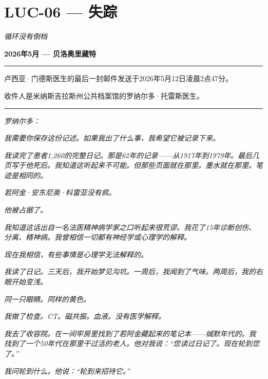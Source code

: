 \section*{\textbf{LUC-06} --- 失踪}

\noindent \textit{循环没有倒档}

\noindent \textbf{2026年5月 --- 贝洛奥里藏特}

\vspace{0.5em}\noindent\rule{\textwidth}{0.5pt}\vspace{0.5em}

\noindent 卢西亚·门德斯医生的最后一封邮件发送于2026年5月12日凌晨2点47分。

\noindent 收件人是米纳斯吉拉斯州公共档案馆的罗纳尔多·托雷斯医生。

\vspace{0.5em}\noindent\rule{\textwidth}{0.5pt}\vspace{0.5em}

\noindent \textit{罗纳尔多：}

\noindent \textit{我需要你保存这份记述。如果我出了什么事，我希望它被记录下来。}

\noindent \textit{我读完了患者1,260的完整日记。那是62年的记录——从1917年到1979年。最后几页写于他死后。我知道这听起来不可能。但那些页面就在那里。墨水就在那里。笔迹是相同的。}

\noindent \textit{若阿金·安东尼奥·科雷亚没有疯。}

\noindent \textit{他被占据了。}

\noindent \textit{我知道这话出自一名法医精神病学家之口听起来很荒谬。我花了15年诊断创伤、分离、精神病。我曾相信一切都有神经学或心理学的解释。}

\noindent \textit{现在我相信，有些事情是心理学无法解释的。}

\noindent \textit{我读了日记。三天后，我开始梦见沟坑。一周后，我闻到了气味。两周后，我的右眼开始变浅。}

\noindent \textit{同一只眼睛。同样的黄色。}

\noindent \textit{我做了检查。CT。磁共振。血液。没有医学解释。}

\noindent \textit{我去了收容院。在一间牢房里找到了若阿金藏起来的笔记本——缄默年代的。我找到了一个50年代在那里干过活的老人。他对我说：\textquotedblleft{}您读过日记了。现在轮到您了。\textquotedblright{}}

\noindent \textit{我问轮到什么。他说：\textquotedblleft{}轮到来招待它。\textquotedblright{}}

